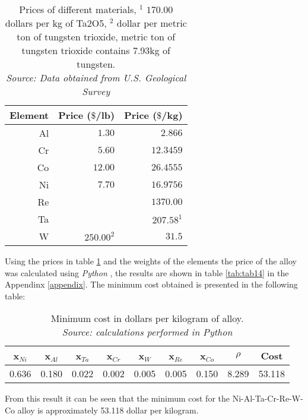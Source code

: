 \begin{table}[h]
    \centering
    \begin{tabular}{rrr}
        \multicolumn{1}{c}{Element} & \multicolumn{1}{c}{Price ($\$$/lb)} & \multicolumn{1}{c}{Price ($\$$/kg)} \\ \hline \hline
        Al & $1.30$ & $2.866$ \\
        Cr & $5.60$ & $12.3459$ \\
        Co & $12.00$ & $26.4555$ \\
        Ni & $7.70$ & $16.9756$ \\
        Re & & $1370.00$ \\
        Ta & &$207.58^1$  \\
        W & $250.00^2$ & $31.5$
    \end{tabular}
    \caption{\centering Prices of different materials, $^1$ $170.00$ dollars per kg of Ta2O5, $^2$ dollar per metric ton of tungsten trioxide, metric ton of tungsten trioxide contains 7.93kg of tungsten. \\
    \textit{Source: Data obtained from U.S. Geological Survey \citep{USGS_MCS2025}}}
    \label{tab:tab13}
\end{table}

\newpage
Using the prices in table \ref{tab:tab13} and the weights of the elements the price of the alloy was calculated using \textit{Python} \citep{mygit}, the results are shown in table \ref{tab:tab14} in the Appendinx \ref{appendix}. The minimum cost obtained is presented in the following table:

\begin{table}[h]
    \centering
    \begin{tabular}{rrrrrrrrr}
        \multicolumn{1}{c}{x$_{Ni}$} & \multicolumn{1}{c}{x$_{Al}$} & \multicolumn{1}{c}{x$_{Ta}$} & \multicolumn{1}{c}{x$_{Cr}$} & \multicolumn{1}{c}{x$_{W}$} & \multicolumn{1}{c}{x$_{Re}$} & \multicolumn{1}{c}{x$_{Co}$} & \multicolumn{1}{c}{$\rho$} & \multicolumn{1}{c}{Cost} \\ \hline \hline
        0.636 & 0.180 & 0.022 & 0.002 & 0.005 & 0.005 & 0.150 & 8.289 & 53.118
    \end{tabular}
    \caption{\centering Minimum cost in dollars per kilogram of alloy. \\
    \textit{Source: calculations performed in Python \citep{mygit}}}
    \label{tab:tab15}
\end{table}

From this result it can be seen that the minimum cost for the Ni-Al-Ta-Cr-Re-W-Co alloy is approximately 53.118 dollar per kilogram.